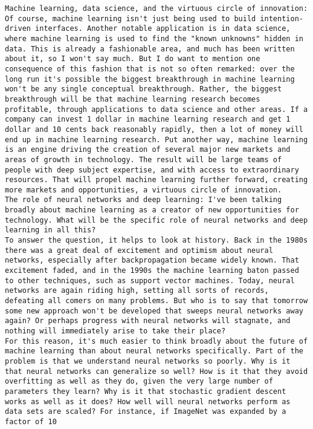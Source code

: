 \begin{lstlisting}
Machine learning, data science, and the virtuous circle of innovation: Of course, machine learning isn't just being used to build intention-driven interfaces. Another notable application is in data science, where machine learning is used to find the "known unknowns" hidden in data. This is already a fashionable area, and much has been written about it, so I won't say much. But I do want to mention one consequence of this fashion that is not so often remarked: over the long run it's possible the biggest breakthrough in machine learning won't be any single conceptual breakthrough. Rather, the biggest breakthrough will be that machine learning research becomes profitable, through applications to data science and other areas. If a company can invest 1 dollar in machine learning research and get 1 dollar and 10 cents back reasonably rapidly, then a lot of money will end up in machine learning research. Put another way, machine learning is an engine driving the creation of several major new markets and areas of growth in technology. The result will be large teams of people with deep subject expertise, and with access to extraordinary resources. That will propel machine learning further forward, creating more markets and opportunities, a virtuous circle of innovation.
The role of neural networks and deep learning: I've been talking broadly about machine learning as a creator of new opportunities for technology. What will be the specific role of neural networks and deep learning in all this?
To answer the question, it helps to look at history. Back in the 1980s there was a great deal of excitement and optimism about neural networks, especially after backpropagation became widely known. That excitement faded, and in the 1990s the machine learning baton passed to other techniques, such as support vector machines. Today, neural networks are again riding high, setting all sorts of records, defeating all comers on many problems. But who is to say that tomorrow some new approach won't be developed that sweeps neural networks away again? Or perhaps progress with neural networks will stagnate, and nothing will immediately arise to take their place?
For this reason, it's much easier to think broadly about the future of machine learning than about neural networks specifically. Part of the problem is that we understand neural networks so poorly. Why is it that neural networks can generalize so well? How is it that they avoid overfitting as well as they do, given the very large number of parameters they learn? Why is it that stochastic gradient descent works as well as it does? How well will neural networks perform as data sets are scaled? For instance, if ImageNet was expanded by a factor of 10

\end{lstlisting}
